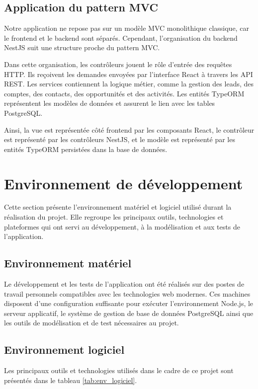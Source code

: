 \documentclass[12pt,a4paper,twoside,openany]{book}
\begin{document}
\subsection{Application du pattern MVC}

Notre application ne repose pas sur un modèle MVC monolithique classique, car le frontend et le backend sont séparés. Cependant, l’organisation du backend NestJS suit une structure proche du pattern MVC.

Dans cette organisation, les contrôleurs jouent le rôle d’entrée des requêtes HTTP. Ils reçoivent les demandes envoyées par l’interface React à travers les API REST. Les services contiennent la logique métier, comme la gestion des leads, des comptes, des contacts, des opportunités et des activités. Les entités TypeORM représentent les modèles de données et assurent le lien avec les tables PostgreSQL.

Ainsi, la vue est représentée côté frontend par les composants React, le contrôleur est représenté par les contrôleurs NestJS, et le modèle est représenté par les entités TypeORM persistées dans la base de données.

\section{Environnement de développement}
Cette section présente l’environnement matériel et logiciel utilisé durant la réalisation du projet. Elle regroupe les principaux outils, technologies et plateformes qui ont servi au développement, à la modélisation et aux tests de l’application.
\subsection{Environnement matériel}

Le développement et les tests de l’application ont été réalisés sur des postes de travail personnels compatibles avec les technologies web modernes. Ces machines disposent d’une configuration suffisante pour exécuter l’environnement Node.js, le serveur applicatif, le système de gestion de base de données PostgreSQL ainsi que les outils de modélisation et de test nécessaires au projet.

\subsection{Environnement logiciel}

Les principaux outils et technologies utilisés dans le cadre de ce projet sont présentés dans le tableau \ref{tab:env_logiciel}.
\end{document}
